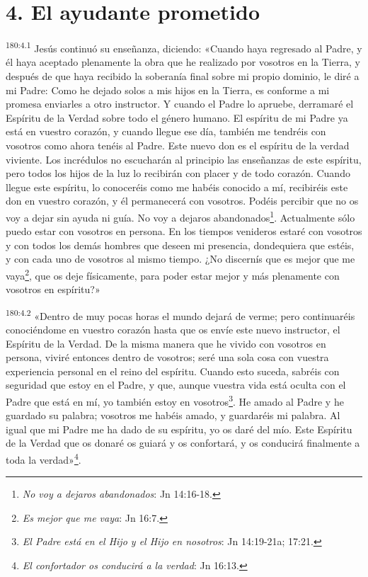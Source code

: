 \section*{4. El ayudante prometido}
\par
\textsuperscript{180:4.1} Jesús continuó su enseñanza, diciendo: «Cuando haya regresado al Padre, y él haya aceptado plenamente la obra que he realizado por vosotros en la Tierra, y después de que haya recibido la soberanía final sobre mi propio dominio, le diré a mi Padre: Como he dejado solos a mis hijos en la Tierra, es conforme a mi promesa enviarles a otro instructor. Y cuando el Padre lo apruebe, derramaré el Espíritu de la Verdad sobre todo el género humano. El espíritu de mi Padre ya está en vuestro corazón, y cuando llegue ese día, también me tendréis con vosotros como ahora tenéis al Padre. Este nuevo don es el espíritu de la verdad viviente. Los incrédulos no escucharán al principio las enseñanzas de este espíritu, pero todos los hijos de la luz lo recibirán con placer y de todo corazón. Cuando llegue este espíritu, lo conoceréis como me habéis conocido a mí, recibiréis este don en vuestro corazón, y él permanecerá con vosotros. Podéis percibir que no os voy a dejar sin ayuda ni guía. No voy a dejaros abandonados\footnote{\textit{No voy a dejaros abandonados}: Jn 14:16-18.}. Actualmente sólo puedo estar con vosotros en persona. En los tiempos venideros estaré con vosotros y con todos los demás hombres que deseen mi presencia, dondequiera que estéis, y con cada uno de vosotros al mismo tiempo. ¿No discernís que es mejor que me vaya\footnote{\textit{Es mejor que me vaya}: Jn 16:7.}, que os deje físicamente, para poder estar mejor y más plenamente con vosotros en espíritu?»

\par
\textsuperscript{180:4.2} «Dentro de muy pocas horas el mundo dejará de verme; pero continuaréis conociéndome en vuestro corazón hasta que os envíe este nuevo instructor, el Espíritu de la Verdad. De la misma manera que he vivido con vosotros en persona, viviré entonces dentro de vosotros; seré una sola cosa con vuestra experiencia personal en el reino del espíritu. Cuando esto suceda, sabréis con seguridad que estoy en el Padre, y que, aunque vuestra vida está oculta con el Padre que está en mí, yo también estoy en vosotros\footnote{\textit{El Padre está en el Hijo y el Hijo en nosotros}: Jn 14:19-21a; 17:21.}. He amado al Padre y he guardado su palabra; vosotros me habéis amado, y guardaréis mi palabra. Al igual que mi Padre me ha dado de su espíritu, yo os daré del mío. Este Espíritu de la Verdad que os donaré os guiará y os confortará, y os conducirá finalmente a toda la verdad»\footnote{\textit{El confortador os conducirá a la verdad}: Jn 16:13.}.

